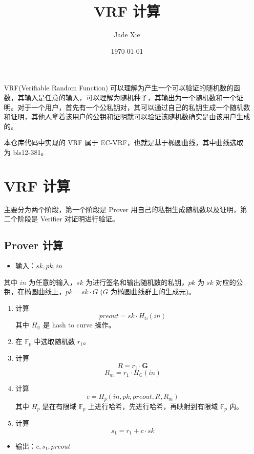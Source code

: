 \documentclass[10pt]{ctexart}
\title{VRF 计算}
\author{Jade Xie}
\date{\today}
\begin{document}
\maketitle

VRF(Verifiable Random Function) 可以理解为产生一个可以验证的随机数的函数，其输入是任意的输入，可以理解为随机种子，其输出为一个随机数和一个证明。对于一个用户，首先有一个公私钥对，其可以通过自己的私钥生成一个随机数和证明，其他人拿着该用户的公钥和证明就可以验证该随机数确实是由该用户生成的。

本仓库代码中实现的 VRF 属于 EC-VRF，也就是基于椭圆曲线，其中曲线选取为 bls12-381。

\section{VRF 计算}

主要分为两个阶段，第一个阶段是 Prover 用自己的私钥生成随机数以及证明，第二个阶段是 Verifier 对证明进行验证。

\subsection{Prover 计算}

\begin{itemize}
    \item 输入：$sk, pk, in$
\end{itemize}
其中 $in$ 为任意的输入，$sk$ 为进行签名和输出随机数的私钥，$pk$ 为 $sk$ 对应的公钥，在椭圆曲线上，$pk = sk \cdot G$ ($G$ 为椭圆曲线群上的生成元)。

\begin{enumerate}
    \item 计算 \[preout = sk \cdot H_{\mathbb{G}}(in)\] 其中 $H_{\mathbb{G}}$ 是 hash to curve 操作。
    \item 在 $\mathbb{F}_p$ 中选取随机数 $r_1$。
    \item 计算 \[ R = r_1 \cdot \mathbf{G} \] \[R_m = r_1 \cdot H_{\mathbb{G}}(in)\]
    \item 计算 \[c = H_p(in, pk, preout, R, R_m)\] 其中 $H_p$ 是在有限域 $\mathbb{F}_p$ 上进行哈希，先进行哈希，再映射到有限域 $\mathbb{F}_p$ 内。
    \item 计算 \[s_1 = r_1 + c \cdot sk\]
\end{enumerate}

\begin{itemize}
    \item 输出：$c, s_1, preout$
\end{itemize}
\end{document}
